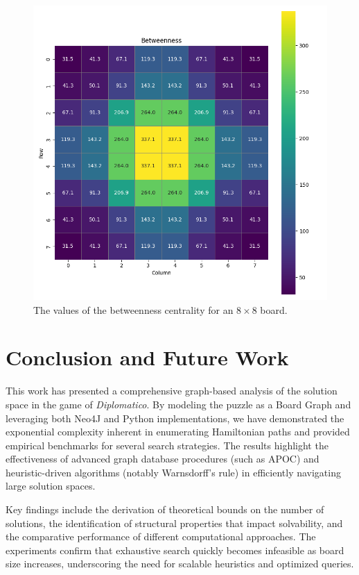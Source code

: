 \documentclass[conference]{IEEEtran}
\begin{document}
\begin{figure}[ht]
	\centering
	\includegraphics[width=1.0\linewidth]{centrality.png}
	\caption{The values of the betweenness centrality for an $8 \times 8$ board.}
	\label{fig:centrality}
\end{figure}

\section{Conclusion and Future Work}
This work has presented a comprehensive graph-based analysis of the solution space in the game of \textit{Diplomatico}. By modeling the puzzle as a Board Graph and leveraging both Neo4J and Python implementations, we have demonstrated the exponential complexity inherent in enumerating Hamiltonian paths and provided empirical benchmarks for several search strategies. The results highlight the effectiveness of advanced graph database procedures (such as APOC) and heuristic-driven algorithms (notably Warnsdorff's rule) in efficiently navigating large solution spaces. 

Key findings include the derivation of theoretical bounds on the number of solutions, the identification of structural properties that impact solvability, and the comparative performance of different computational approaches. The experiments confirm that exhaustive search quickly becomes infeasible as board size increases, underscoring the need for scalable heuristics and optimized queries.
\end{document}
